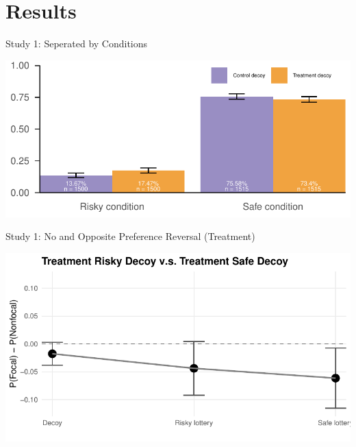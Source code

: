 \documentclass[
  ignorenonframetext,
  aspectratio=169]{beamer}
\begin{document}
\section{Results}\label{results}

\begin{frame}{Study 1: Seperated by Conditions}
\label{study-1-seperated-by-conditions}
\begin{flushright}\includegraphics{BE_Lab_1023_files/figure-beamer/unnamed-chunk-1-1} \end{flushright}
\end{frame}

\begin{frame}{Study 1: No and Opposite Preference Reversal (Treatment)}
\label{study-1-no-and-opposite-preference-reversal-treatment}
\begin{flushright}\includegraphics{BE_Lab_1023_files/figure-beamer/unnamed-chunk-3-1} \end{flushright}
\end{frame}
\end{document}
